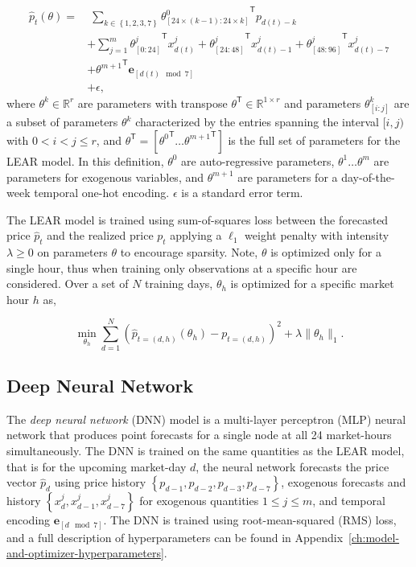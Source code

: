 \begin{align*}
    \hat{p}_t(\theta) = & \; \sum_{k \in \left\{ 1, 2, 3, 7 \right\}} {\theta^0_{\left[ 24 \times (k-1) : 24 \times k \right]}}^\mathsf{T} p_{d(t) - k} \\
                        & +  \sum_{j=1}^m {\theta^j_{\left[0:24\right]}}^\mathsf{T} x^j_{d(t)} + {\theta^j_{\left[24:48\right]}}^\mathsf{T} x^j_{d(t) - 1} + {\theta^j_{\left[48:96\right]}}^\mathsf{T} x^j_{d(t) - 7} \\
                        & +  {\theta^{m + 1}}^\mathsf{T} \textbf{e}_{\left[d(t) \mod 7\right]} \\
                        & +  \epsilon,
\end{align*}
where $\theta^k \in \mathbb{R}^r$ are parameters with transpose $\theta^\mathsf{T} \in \mathbb{R}^{1 \times r}$ and
parameters ${\theta^k_{\left[i:j\right]}}$ are a subset of parameters $\theta^k$
characterized by the entries spanning the interval $[i, j)$ with $0 < i < j \leq r$, and
$\theta^\mathsf{T} = [{\theta^0}^\mathsf{T} \dots {\theta^{m+1}}^\mathsf{T}]$ is the full set of parameters for the LEAR model.
In this definition, $\theta^0$ are auto-regressive parameters, $\theta^{1} \dots \theta^{m}$ are parameters
for exogenous variables, and $\theta^{m+1}$ are parameters for a day-of-the-week temporal one-hot encoding. $\epsilon$
is a standard error term.

The LEAR model is trained using sum-of-squares loss between the forecasted price $\hat{p}_t$ and the realized price
$p_t$ applying a $\ell_1$ weight penalty with intensity $\lambda \geq 0$ on parameters $\theta$ to encourage sparsity.
Note, $\theta$ is optimized only for a single hour, thus when training only observations at a specific hour are considered.
Over a set of $N$ training days, $\theta_h$ is optimized for a specific market hour $h$ as,

\begin{equation}
    \min_{\theta_h} \sum_{d=1}^N \left(\hat{p}_{t=(d, h)}(\theta_h) - p_{t=(d, h)}\right)^2 + \lambda \lVert \theta_h \rVert_1. \nonumber
    \label{eq:lear_loss}
\end{equation}

\subsection{Deep Neural Network}\label{subsec:deep-neural-network}

The \textit{deep neural network} (DNN) model is a multi-layer perceptron (MLP) neural network that produces point forecasts for
a single node at all 24 market-hours simultaneously.
The DNN is trained on the same quantities as the LEAR model, that is for the upcoming market-day $d$, the neural network
forecasts the price vector $\hat{p}_d$ using price history $\left\{ p_{d-1}, p_{d-2}, p_{d-3}, p_{d-7} \right\}$,
exogenous forecasts and history $\left\{ x^j_{d}, x^j_{d - 1}, x^j_{d-7} \right\}$ for exogenous quantities
$1 \leq j \leq m$, and temporal encoding $\mathbf{e}_{\left[d \mod 7\right]}$.
The DNN is trained using root-mean-squared (RMS) loss, and a full description of hyperparameters can be found in
Appendix~\ref{ch:model-and-optimizer-hyperparameters}.

